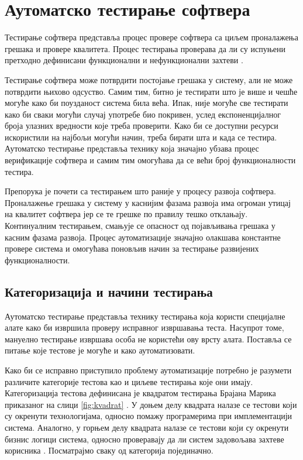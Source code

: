 \documentclass[12pt,oneside]{memoir}
\begin{document}
\chapter{Аутоматско тестирање софтвера}
\label{chp:testiranje}

Тестирање софтвера представља процес провере софтвера са циљем проналажења грешака и провере квалитета. Процес тестирања проверава да ли су испуњени претходно дефинисани функционални и нефункционални захтеви \cite{ISTQB}.

Тестирање софтвера може потврдити постојање грешака у систему, али не може потврдити њихово одсуство. Самим тим, битно је тестирати што је више и чешће могуће како би поузданост система била већа. Ипак, није могуће све тестирати како би сваки могући случај употребе био покривен, услед експоненцијалног броја улазних вредности које треба проверити. Како би се доступни ресурси искористили на најбољи могући начин, треба бирати шта и када се тестира. Аутоматско тестирање представља технику која значајно убзава процес верификације софтвера и самим тим омогућава да се већи број функционалности тестира.

Препорука је почети са тестирањем што раније у процесу развоја софтвера. Проналажење грешака у систему у каснијим фазама развоја има огроман утицај на квалитет софтвера јер се те грешке по правилу тешко отклањају. Континуалним тестирањем, смањује се опасност од појављивања грешака у касним фазама развоја. Процес аутоматизације значајно олакшава константне провере система и омогућава поновљив начин за тестирање развијених функционалности.


\section{Категоризација и начини тестирања}

Аутоматско тестирање представља технику тестирања која користи специјалне алате како би извршила проверу исправног извршавања теста. Насупрот томе, мануелно тестирање извршава особа не користећи ову врсту алата. Поставља се питање које тестове је могуће и како аутоматизовати.

Како би се исправно приступило проблему аутоматизације потребно је разумети различите категорије тестова као и циљеве тестирања које они имају. Категоризација тестова дефинисана је квадратом тестирања Брајана Марика приказаног на слици \ref{fig:kvadrat} \cite{testiranjeBook}. У доњем делу квадрата налазе се тестови који су окренути технологијама, односно помажу програмерима при имплементацији система. Аналогно, у горњем делу квадрата налазе се тестови који су окренути бизнис логици система, односно проверавају да ли систем задовољава захтеве корисника \cite{microservicesBook}. Посматрајмо сваку од категорија појединачно.
\end{document}
